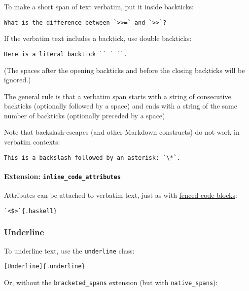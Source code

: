 To make a short span of text verbatim, put it inside backticks:

\begin{verbatim}
What is the difference between `>>=` and `>>`?
\end{verbatim}

If the verbatim text includes a backtick, use double backticks:

\begin{verbatim}
Here is a literal backtick `` ` ``.
\end{verbatim}

(The spaces after the opening backticks and before the closing backticks
will be ignored.)

The general rule is that a verbatim span starts with a string of
consecutive backticks (optionally followed by a space) and ends with a
string of the same number of backticks (optionally preceded by a space).

Note that backslash-escapes (and other Markdown constructs) do not work
in verbatim contexts:

\begin{verbatim}
This is a backslash followed by an asterisk: `\*`.
\end{verbatim}

\hypertarget{extension-inline_code_attributes}{%
\paragraph{\texorpdfstring{Extension:
\texttt{inline\_code\_attributes}}{Extension: inline\_code\_attributes}}\label{extension-inline_code_attributes}}

Attributes can be attached to verbatim text, just as with
\protect\hyperlink{fenced-code-blocks}{fenced code blocks}:

\begin{verbatim}
`<$>`{.haskell}
\end{verbatim}

\hypertarget{underline}{%
\subsubsection{Underline}\label{underline}}

To underline text, use the \texttt{underline} class:

\begin{verbatim}
[Underline]{.underline}
\end{verbatim}

Or, without the \texttt{bracketed\_spans} extension (but with
\texttt{native\_spans}):

